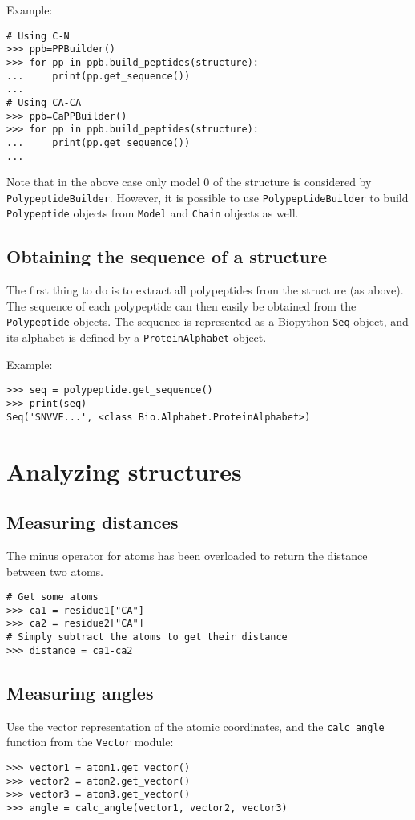 Example:

\begin{verbatim}
# Using C-N
>>> ppb=PPBuilder()
>>> for pp in ppb.build_peptides(structure):
...     print(pp.get_sequence())
...
# Using CA-CA
>>> ppb=CaPPBuilder()
>>> for pp in ppb.build_peptides(structure):
...     print(pp.get_sequence())
...
\end{verbatim}
Note that in the above case only model 0 of the structure is considered
by \texttt{PolypeptideBuilder}. However, it is possible to use \texttt{PolypeptideBuilder}
to build \texttt{Polypeptide} objects from \texttt{Model} and \texttt{Chain}
objects as well.

\subsection*{Obtaining the sequence of a structure}

The first thing to do is to extract all polypeptides from the structure
(as above). The sequence of each polypeptide can then easily
be obtained from the \texttt{Polypeptide} objects. The sequence is
represented as a Biopython \texttt{Seq} object, and its alphabet is
defined by a \texttt{ProteinAlphabet} object.

Example:

\begin{verbatim}
>>> seq = polypeptide.get_sequence()
>>> print(seq)
Seq('SNVVE...', <class Bio.Alphabet.ProteinAlphabet>)
\end{verbatim}

\section{Analyzing structures}

\subsection{Measuring distances}
The minus operator for atoms has been overloaded to return the distance between two atoms.
\begin{verbatim}
# Get some atoms
>>> ca1 = residue1["CA"]
>>> ca2 = residue2["CA"]
# Simply subtract the atoms to get their distance
>>> distance = ca1-ca2
\end{verbatim}

\subsection{Measuring angles}
Use the vector representation of the atomic coordinates, and
the \texttt{calc\_angle} function from the \texttt{Vector} module:
\begin{verbatim}
>>> vector1 = atom1.get_vector()
>>> vector2 = atom2.get_vector()
>>> vector3 = atom3.get_vector()
>>> angle = calc_angle(vector1, vector2, vector3)
\end{verbatim}

